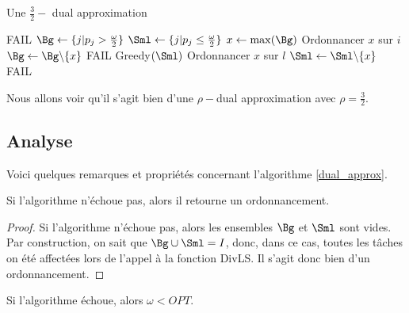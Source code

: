 \documentclass[a4paper,12pt]{thesis}
\begin{document}
\begin{algorithm}[h!]
    \caption{Une $\frac{3}{2}-$ dual approximation}
    \label{dual_approx}
    \begin{algorithmic}[1]
                \State \Return FAIL
            \EndIf
            \State $\Bg \gets \{ j | p_j  > \frac{\omega}{2} \}$
            \State $\Sml \gets \{ j | p_j \leq \frac{\omega}{2} \}$
                \State $x \gets \max(\Bg)$
                \State Ordonnancer $x$ sur $i$
                \State $\Bg \gets \Bg \backslash \{x\}$
            \EndFor
            \If{$\Bg \neq \emptyset$}
                \State \Return FAIL
            \EndIf
            \State \Return Greedy$(\Sml)$
        \EndFunction
                \State Ordonnancer $x$ sur $l$
                \State $\Sml \gets \Sml \backslash \{x\}$
            \EndWhile
            \If{$\Sml \neq \emptyset$}
                \State \Return FAIL
            \EndIf
        \EndFunction
    \end{algorithmic}
\end{algorithm}

Nous allons voir qu'il s'agit bien d'une $\rho-$dual approximation avec $\rho = \frac{3}{2}$.

\subsection*{Analyse}

Voici quelques remarques et propriétés concernant l'algorithme \ref{dual_approx}.

\begin{nlemma}
    \label{ordo}
    Si l'algorithme n'échoue pas, alors il retourne un ordonnancement.
\end{nlemma}

\begin{proof}
    Si l'algorithme n'échoue pas, alors les ensembles $\Bg$ et $\Sml$ sont vides. Par construction,
    on sait que $\Bg \cup \Sml = I$, donc, dans ce cas, toutes les tâches on été affectées lors de
    l'appel à la fonction DivLS. Il s'agit donc bien d'un ordonnancement.
\end{proof}

\begin{nlemma}
    \label{borne_omega}
    Si l'algorithme échoue, alors $\omega < OPT$.
\end{nlemma}
\end{document}
